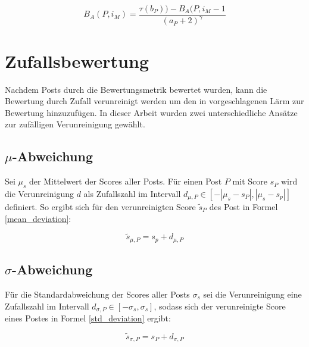 \begin{equation}
\label{Activation}
B_A(P, i_M) = \frac{\tau(b_{P})) - B_A(P,i_M-1}{(a_{P} + 2)^{\gamma}}
\end{equation}


\section{Zufallsbewertung}

Nachdem Posts durch die Bewertungsmetrik bewertet wurden, kann die Bewertung durch Zufall verunreinigt werden um den in \cite{Luu} vorgeschlagenen Lärm zur Bewertung hinzuzufügen. In dieser Arbeit wurden zwei unterschiedliche Ansätze zur zufälligen Verunreinigung gewählt.

\subsection{$\mu$-Abweichung}

Sei $\mu_s$ der Mittelwert der Scores aller Posts. Für einen Post $P$ mit Score $s_P$ wird die Verunreinigung $d$ als Zufallszahl im Intervall $d_{\mu,P} \in [-|\mu_s - s_P|,|\mu_s - s_p|]$ definiert. So ergibt sich für den verunreinigten Score $\tilde{s}_P$ des Post in Formel \ref{mean_deviation}:

\begin{equation}
\label{mean_deviation}
\tilde{s}_{\mu,P} =  s_p + d_{\mu,P}
\end{equation} 

\subsection{$\sigma$-Abweichung}

Für die Standardabweichung der Scores aller Posts $\sigma_s$ sei die Verunreinigung eine Zufallszahl im Intervall $d_{\sigma,P} \in [-\sigma_s,\sigma_s]$, sodass sich der verunreinigte Score eines Postes in Formel \ref{std_deviation} ergibt:

\begin{equation}
\label{std_deviation}
\tilde{s}_{\sigma,P} = s_P + d_{\sigma,P}
\end{equation}

	